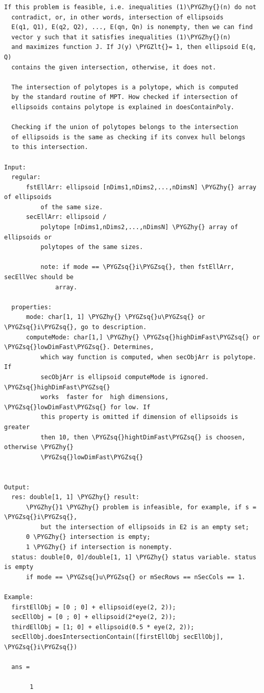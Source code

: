 \documentclass[letterpaper,10pt,english]{sphinxmanual}
\def\PYGZlt{\char`\<}
\def\PYGZhy{\char`\-}
\def\PYGZsq{\char`\'}
\begin{document}
\begin{Verbatim}[commandchars=\\\{\}]
  If this problem is feasible, i.e. inequalities (1)\PYGZhy{}(n) do not
  contradict, or, in other words, intersection of ellipsoids
  E(q1, Q1), E(q2, Q2), ..., E(qn, Qn) is nonempty, then we can find
  vector y such that it satisfies inequalities (1)\PYGZhy{}(n)
  and maximizes function J. If J(y) \PYGZlt{}= 1, then ellipsoid E(q, Q)
  contains the given intersection, otherwise, it does not.

  The intersection of polytopes is a polytope, which is computed
  by the standard routine of MPT. How checked if intersection of
  ellipsoids contains polytope is explained in doesContainPoly.

  Checking if the union of polytopes belongs to the intersection
  of ellipsoids is the same as checking if its convex hull belongs
  to this intersection.

Input:
  regular:
      fstEllArr: ellipsoid [nDims1,nDims2,...,nDimsN] \PYGZhy{} array of ellipsoids
          of the same size.
      secEllArr: ellipsoid /
          polytope [nDims1,nDims2,...,nDimsN] \PYGZhy{} array of ellipsoids or
          polytopes of the same sizes.

          note: if mode == \PYGZsq{}i\PYGZsq{}, then fstEllArr, secEllVec should be
              array.

  properties:
      mode: char[1, 1] \PYGZhy{} \PYGZsq{}u\PYGZsq{} or \PYGZsq{}i\PYGZsq{}, go to description.
      computeMode: char[1,] \PYGZhy{} \PYGZsq{}highDimFast\PYGZsq{} or \PYGZsq{}lowDimFast\PYGZsq{}. Determines,
          which way function is computed, when secObjArr is polytope. If
          secObjArr is ellipsoid computeMode is ignored. \PYGZsq{}highDimFast\PYGZsq{}
          works  faster for  high dimensions, \PYGZsq{}lowDimFast\PYGZsq{} for low. If
          this property is omitted if dimension of ellipsoids is greater
          then 10, then \PYGZsq{}hightDimFast\PYGZsq{} is choosen, otherwise \PYGZhy{}
          \PYGZsq{}lowDimFast\PYGZsq{}


Output:
  res: double[1, 1] \PYGZhy{} result:
      \PYGZhy{}1 \PYGZhy{} problem is infeasible, for example, if s = \PYGZsq{}i\PYGZsq{},
          but the intersection of ellipsoids in E2 is an empty set;
      0 \PYGZhy{} intersection is empty;
      1 \PYGZhy{} if intersection is nonempty.
  status: double[0, 0]/double[1, 1] \PYGZhy{} status variable. status is empty
      if mode == \PYGZsq{}u\PYGZsq{} or mSecRows == nSecCols == 1.

Example:
  firstEllObj = [0 ; 0] + ellipsoid(eye(2, 2));
  secEllObj = [0 ; 0] + ellipsoid(2*eye(2, 2));
  thirdEllObj = [1; 0] + ellipsoid(0.5 * eye(2, 2));
  secEllObj.doesIntersectionContain([firstEllObj secEllObj], \PYGZsq{}i\PYGZsq{})

  ans =

       1
\end{Verbatim}
\end{document}
